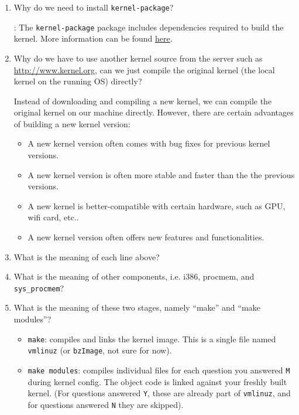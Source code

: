

\begin{enumerate}[1.]
  \item Why do we need to install \lstinline{kernel-package}?
    \par {}: The \lstinline{kernel-package} package includes dependencies required to build the kernel. More information can be found \href{https://launchpad.net/ubuntu/bionic/+package/kernel-package}{here}.
  \item Why do we have to use another kernel source from the server such as \href{http://www.kernel.org}{http://www.kernel.org}, can we just compile the original kernel (the local kernel on the running OS) directly?
    \par Instead of downloading and compiling a new kernel, we can compile the original kernel on our machine directly. However, there are certain advantages of building a new kernel version:
    \begin{itemize}
      \item A new kernel version often comes with bug fixes for previous kernel versions.
      \item A new kernel version is often more stable and faster than the the previous versions.
      \item A new kernel is better-compatible with certain hardware, such as GPU, wifi card, etc..
      \item A new kernel version often offers new features and functionalities.
    \end{itemize}
  \item What is the meaning of each line above?
  \item What is the meaning of other components, i.e. i386, procmem, and \lstinline{sys_procmem}?
  \item What is the meaning of these two stages, namely “make” and “make modules”?
    \begin{itemize}
      \item \lstinline{make}: compiles and links the kernel image. This is a single file named \lstinline{vmlinuz} (or \lstinline{bzImage}, not sure for now).
      \item \lstinline{make modules}: compiles individual files for each question you answered \lstinline{M} during kernel config. The object code is linked against your freshly built kernel. (For questions answered \lstinline{Y}, these are already part of \lstinline{vmlinuz}, and for questions answered \lstinline{N} they are skipped).

\end{itemize}
\end{enumerate}
